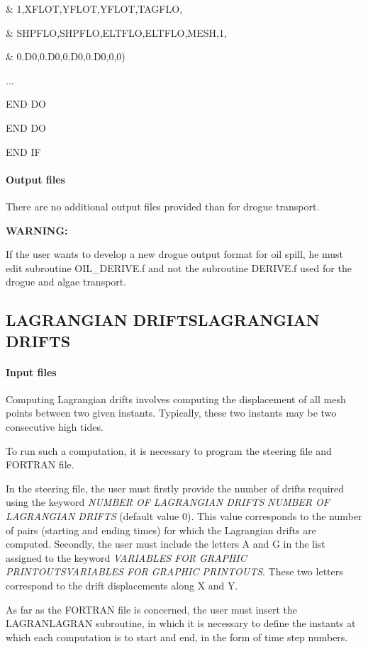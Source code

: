 \documentclass{article} %
\begin{document}
\&                       1,XFLOT,YFLOT,YFLOT,TAGFLO,

\&                       SHPFLO,SHPFLO,ELTFLO,ELTFLO,MESH,1,

\&                       0.D0,0.D0,0.D0,0.D0,0,0)

...

    END DO

  END DO

END IF


\paragraph{ Output files}

 There are no additional output files provided than for drogue transport.

 \textbf{WARNING:}

 If the user wants to develop a new drogue output format for oil spill, he must edit subroutine OIL\_DERIVE.f and not the subroutine DERIVE.f used for the drogue and algae transport.


\subsection{ LAGRANGIAN DRIFTSLAGRANGIAN DRIFTS}


\paragraph{ Input files}

 Computing Lagrangian drifts involves computing the displacement of all mesh points between two given instants. Typically, these two instants may be two consecutive high tides.

 To run such a computation, it is necessary to program the steering file and FORTRAN file.

 In the steering file, the user must firstly provide the number of drifts required using the keyword \textit{NUMBER OF LAGRANGIAN DRIFTS} \textit{NUMBER OF LAGRANGIAN DRIFTS} (default value 0). This value corresponds to the number of pairs (starting and ending times) for which the Lagrangian drifts are computed. Secondly, the user must include the letters A and G in the list assigned to the keyword \textit{VARIABLES FOR GRAPHIC PRINTOUTSVARIABLES FOR GRAPHIC PRINTOUTS}. These two letters correspond to the drift displacements along X and Y.

 As far as the FORTRAN file is concerned, the user must insert the LAGRANLAGRAN subroutine, in which it is necessary to define the instants at which each computation is to start and end, in the form of time step numbers.
\end{document}
